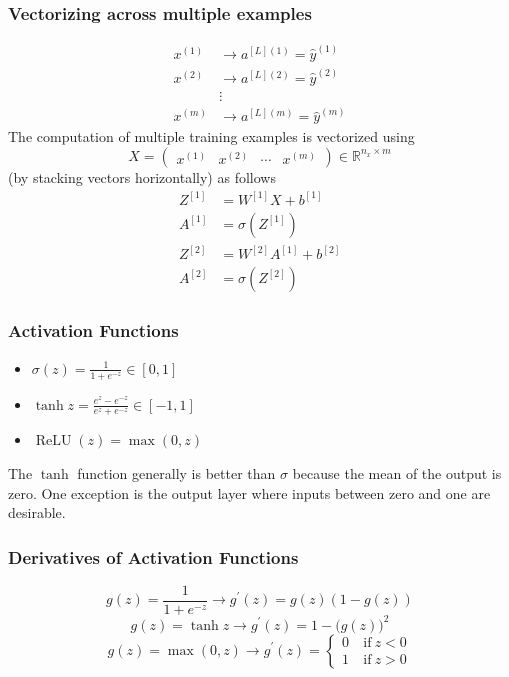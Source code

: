 \documentclass{article}
\begin{document}
\subsubsection{Vectorizing across multiple examples}
\begin{equation}
  \begin{split}
    x^{(1)}&\to a^{[L](1)}=\hat{y}^{(1)}\\
    x^{(2)}&\to a^{[L](2)}=\hat{y}^{(2)}\\
    &\vdots\\
    x^{(m)}&\to a^{[L](m)}=\hat{y}^{(m)}
  \end{split}
\end{equation}
The computation of multiple training examples is vectorized using
\begin{equation}
  X=\begin{pmatrix}x^{(1)} & x^{(2)} & \cdots & x^{(m)}\end{pmatrix}\in\mathbb{R}^{n_x\times m}
\end{equation}
(by stacking vectors horizontally) as follows
\begin{equation}
  \begin{split}
    Z^{[1]}&=W^{[1]}X+b^{[1]}\\
    A^{[1]}&=\sigma(Z^{[1]})\\
    Z^{[2]}&=W^{[2]}A^{[1]}+b^{[2]}\\
    A^{[2]}&=\sigma(Z^{[2]})
  \end{split}
\end{equation}

\subsubsection{Activation Functions}
\begin{itemize}
  \item $\sigma(z)=\frac{1}{1+e^{-z}}\in[0,1]$
  \item $\tanh z=\frac{e^z-e^{-z}}{e^z+e^{-z}}\in[-1,1]$
  \item $\operatorname{ReLU}(z)=\max(0, z)$
\end{itemize}

The $\tanh$ function generally is better than $\sigma$ because the mean of the output is zero.
One exception is the output layer where inputs between zero and one are desirable.

\subsubsection{Derivatives of Activation Functions}
\begin{equation}
  g(z)=\frac{1}{1+e^{-z}}\to g^\prime(z)=g(z)(1-g(z))
\end{equation}
\begin{equation}
  g(z)=\tanh{z}\to g^\prime(z)=1-\big(g(z)\big)^2
\end{equation}
\begin{equation}
  g(z)=\max(0, z)\to g^\prime(z)=\left\{\begin{array}{ll}0&\mathrm{\ if\ }z<0\\1&\mathrm{\ if\ }z>0\end{array}\right.
\end{equation}
\end{document}
